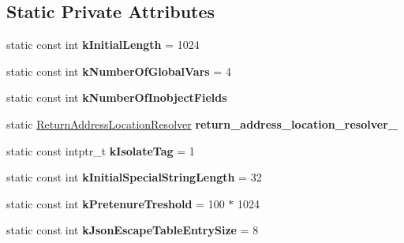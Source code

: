 \subsection*{Static Private Attributes}
\begin{DoxyCompactItemize}
\item 
static const int {\bfseries k\+Initial\+Length} = 1024\hypertarget{classv8_1_1internal_1_1_b_a_s_e___e_m_b_e_d_d_e_d_a6c366c3bd3170d7014586f30495ce779}{}\label{classv8_1_1internal_1_1_b_a_s_e___e_m_b_e_d_d_e_d_a6c366c3bd3170d7014586f30495ce779}

\item 
static const int {\bfseries k\+Number\+Of\+Global\+Vars} = 4\hypertarget{classv8_1_1internal_1_1_b_a_s_e___e_m_b_e_d_d_e_d_aa59d596a3ca57a8d019b05485aca2d95}{}\label{classv8_1_1internal_1_1_b_a_s_e___e_m_b_e_d_d_e_d_aa59d596a3ca57a8d019b05485aca2d95}

\item 
static const int {\bfseries k\+Number\+Of\+Inobject\+Fields}
\item 
static \hyperlink{namespacev8_a8ce54c75241be41ff6a25e9944eefd2a}{Return\+Address\+Location\+Resolver} {\bfseries return\+\_\+address\+\_\+location\+\_\+resolver\+\_\+}\hypertarget{classv8_1_1internal_1_1_b_a_s_e___e_m_b_e_d_d_e_d_a803ba316d4d4116ec2cc8e5685a74d5d}{}\label{classv8_1_1internal_1_1_b_a_s_e___e_m_b_e_d_d_e_d_a803ba316d4d4116ec2cc8e5685a74d5d}

\item 
static const intptr\+\_\+t {\bfseries k\+Isolate\+Tag} = 1\hypertarget{classv8_1_1internal_1_1_b_a_s_e___e_m_b_e_d_d_e_d_ace783e837a24c020c860f0032851e734}{}\label{classv8_1_1internal_1_1_b_a_s_e___e_m_b_e_d_d_e_d_ace783e837a24c020c860f0032851e734}

\item 
static const int {\bfseries k\+Initial\+Special\+String\+Length} = 32\hypertarget{classv8_1_1internal_1_1_b_a_s_e___e_m_b_e_d_d_e_d_a8951eea5cbf1b5309d5d185242c7406b}{}\label{classv8_1_1internal_1_1_b_a_s_e___e_m_b_e_d_d_e_d_a8951eea5cbf1b5309d5d185242c7406b}

\item 
static const int {\bfseries k\+Pretenure\+Treshold} = 100 $\ast$ 1024\hypertarget{classv8_1_1internal_1_1_b_a_s_e___e_m_b_e_d_d_e_d_a00844897bb8b6c10b9af661ac2c241ee}{}\label{classv8_1_1internal_1_1_b_a_s_e___e_m_b_e_d_d_e_d_a00844897bb8b6c10b9af661ac2c241ee}

\item 
static const int {\bfseries k\+Json\+Escape\+Table\+Entry\+Size} = 8\hypertarget{classv8_1_1internal_1_1_b_a_s_e___e_m_b_e_d_d_e_d_a281b459464fbddc44f742c2e2958e10a}{}\label{classv8_1_1internal_1_1_b_a_s_e___e_m_b_e_d_d_e_d_a281b459464fbddc44f742c2e2958e10a}


\end{DoxyCompactItemize}
